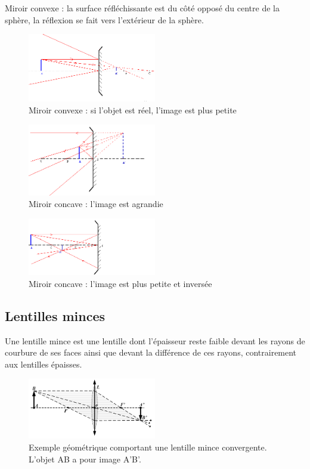 \documentclass[a4paper,11pt]{article}
\begin{document}
\begin{defi}
Miroir convexe : la surface réfléchissante est du côté opposé du centre de la sphère, la réflexion se fait vers l’extérieur de la sphère.
\begin{figure}[h]
  \caption{Miroir convexe : si l'objet est réel, l'image est plus petite}
  \centering
  \includegraphics[width=0.5\textwidth]{miroirconvexe}
\end{figure}

\begin{figure}[h]
  \caption{Miroir concave : l'image est agrandie}
  \centering
  \includegraphics[width=0.5\textwidth]{miroirconcave1}
\end{figure}

\begin{figure}[h]
  \caption{Miroir concave : l'image est plus petite et inversée}
  \centering
  \includegraphics[width=0.5\textwidth]{miroirconcave2}
\end{figure}

\end{defi}
\subsection{Lentilles minces}
Une lentille mince est une lentille dont l'épaisseur reste faible devant les rayons de courbure de ses faces ainsi que devant la différence de ces rayons, contrairement aux lentilles épaisses.
\begin{figure}[h]
  \caption{Exemple géométrique comportant une lentille mince convergente. L'objet AB a pour image A'B'.}
  \centering
  \includegraphics[width=0.5\textwidth]{ThinLens}
\end{figure}
\end{document}
